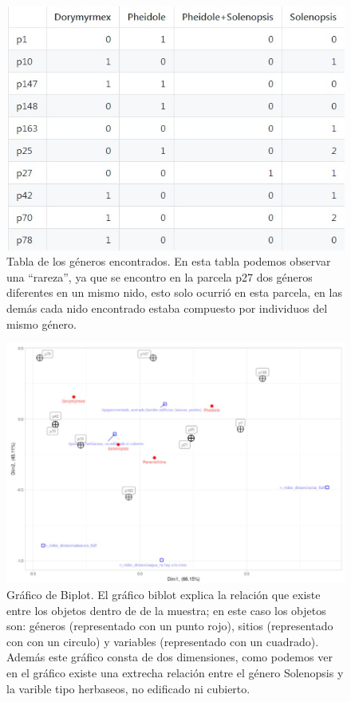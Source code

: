 \documentclass[11pt,]{article}
\begin{document}
\begin{figure}
\centering
\includegraphics{similtud.jpg}
\caption{Tabla de los géneros encontrados. En esta tabla podemos
observar una ``rareza'', ya que se encontro en la parcela p27 dos
géneros diferentes en un mismo nido, esto solo ocurrió en esta parcela,
en las demás cada nido encontrado estaba compuesto por individuos del
mismo género.}
\end{figure}

\begin{figure}
\centering
\includegraphics{biplot.jpg}
\caption{Gráfico de Biplot. El gráfico biblot explica la relación que
existe entre los objetos dentro de de la muestra; en este caso los
objetos son: géneros (representado con un punto rojo), sitios
(representado con con un circulo) y variables (representado con un
cuadrado). Además este gráfico consta de dos dimensiones, como podemos
ver en el gráfico existe una extrecha relación entre el género
Solenopsis y la varible tipo herbaseos, no edificado ni cubierto.}
\end{figure}
\end{document}

